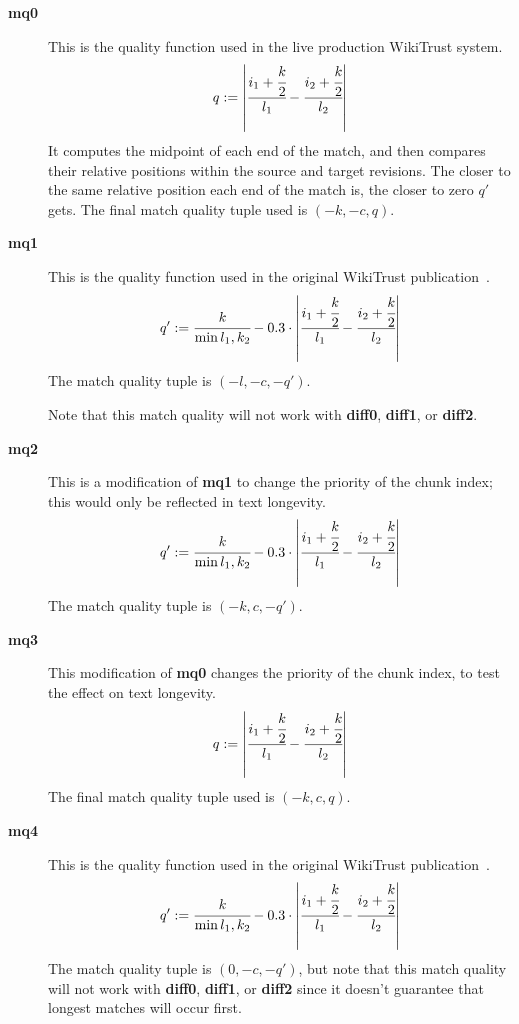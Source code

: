 \begin{description}

\item[\textbf{mq0}] This is the quality function used in the
    live production WikiTrust system.
    \begin{equation*}
    q := \left|\cfrac{ i_1 + \cfrac{k}{2} }{l_1}
            - \cfrac{ i_2 + \cfrac{k}{2} }{l_2} \right|
    \end{equation*}
    It computes the midpoint of each end of the match,
    and then compares their relative positions within
    the source and target revisions.
    The closer to the same relative position each end of
    the match is, the closer to zero $q'$ gets.
    The final match quality tuple used is $(-k, -c, q)$.

\item[\textbf{mq1}] This is the quality function used in the
    original WikiTrust publication~\cite{Adler2007}.
    \begin{equation*}
    q' := \cfrac{k}{\min{l_1, k_2}} - 0.3 \cdot
        \left|\cfrac{ i_1 + \cfrac{k}{2} }{l_1}
            - \cfrac{ i_2 + \cfrac{k}{2} }{l_2} \right|
    \end{equation*}
    The match quality tuple is $(-l, -c, -q')$.

    Note that this match quality will not work with
    \textbf{diff0}, \textbf{diff1}, or \textbf{diff2}.

\item[\textbf{mq2}] This is a modification of \textbf{mq1}
    to change the priority of the chunk index; this would
    only be reflected in text longevity.
    \begin{equation*}
    q' := \cfrac{k}{\min{l_1, k_2}} - 0.3 \cdot
        \left|\cfrac{ i_1 + \cfrac{k}{2} }{l_1}
            - \cfrac{ i_2 + \cfrac{k}{2} }{l_2} \right|
    \end{equation*}
    The match quality tuple is $(-k, c, -q')$.

\item[\textbf{mq3}] This modification of \textbf{mq0}
    changes the priority of the chunk index, to test
    the effect on text longevity.
    \begin{equation*}
    q := \left|\cfrac{ i_1 + \cfrac{k}{2} }{l_1}
            - \cfrac{ i_2 + \cfrac{k}{2} }{l_2} \right|
    \end{equation*}
    The final match quality tuple used is $(-k, c, q)$.

\item[\textbf{mq4}] This is the quality function used in the
    original WikiTrust publication~\cite{Adler2007}.
    \begin{equation*}
    q' := \cfrac{k}{\min{l_1, k_2}} - 0.3 \cdot
        \left|\cfrac{ i_1 + \cfrac{k}{2} }{l_1}
            - \cfrac{ i_2 + \cfrac{k}{2} }{l_2} \right|
    \end{equation*}
    The match quality tuple is $(0, -c, -q')$,
    but note that this match quality will not work with
    \textbf{diff0}, \textbf{diff1}, or \textbf{diff2}
    since it doesn't guarantee that longest matches
    will occur first.

\end{description}

